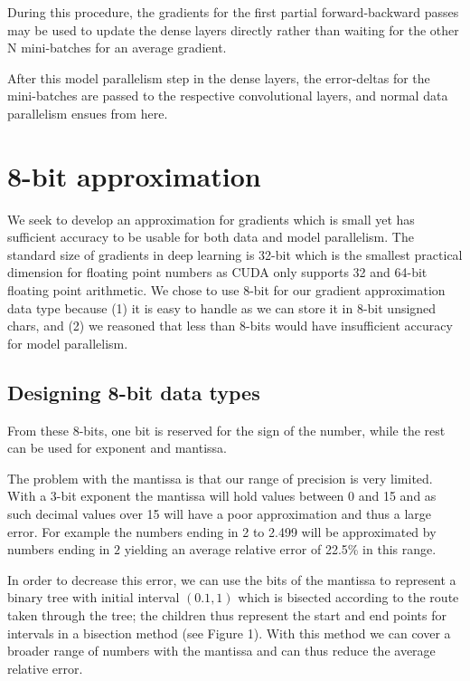 \documentclass{article} %
\begin{document}
During this procedure, the gradients for the first partial forward-backward passes may be used to update the dense layers directly rather than waiting for the other N mini-batches for an average gradient. 

After this model parallelism step in the dense layers, the error-deltas for the mini-batches are passed to the respective convolutional layers, and normal data parallelism ensues from here.

\section{8-bit approximation}

We seek to develop an approximation for gradients which is small yet has sufficient accuracy to be usable for both data and model parallelism. The standard size of gradients in deep learning is 32-bit which is the smallest practical dimension for floating point numbers as CUDA only supports 32 and 64-bit floating point arithmetic. We chose to use 8-bit for our gradient approximation data type because (1) it is easy to handle as we can store it in 8-bit unsigned chars, and (2) we reasoned that less than 8-bits would have insufficient accuracy for model parallelism. 

\subsection{Designing 8-bit data types}

From these 8-bits, one bit is reserved for the sign of the number, while the rest can be used for exponent and mantissa. 

The problem with the mantissa is that our range of precision is very limited. With a 3-bit exponent the mantissa will hold values between 0 and 15 and as such decimal values over 15 will have a poor approximation and thus a large error. For example the numbers ending in 2 to 2.499 will be approximated by numbers ending in $2$ yielding an average relative error of 22.5\% in this range.

In order to decrease this error, we can use the bits of the mantissa to represent a binary tree with initial interval $(0.1,1)$ which is bisected according to the route taken through the tree; the children thus represent the start and end points for intervals in a bisection method (see Figure 1). With this method we can cover a broader range of numbers with the mantissa and can thus reduce the average relative error.
\end{document}
